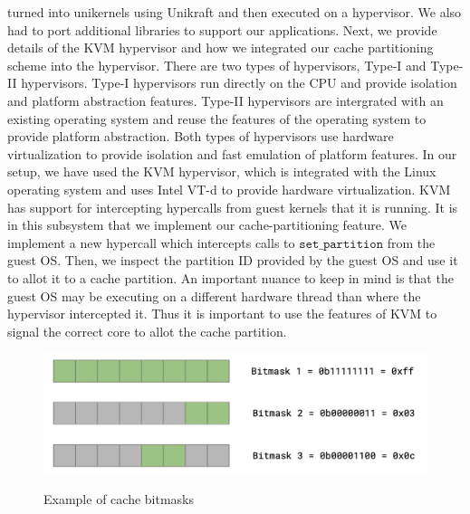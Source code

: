 \documentclass[sigconf,authorversion,noacm]{acmart}
\begin{document}
turned into unikernels using Unikraft and then executed on a hypervisor. We also
had to port additional libraries to support our applications. Next, we provide
details of the KVM hypervisor and how we integrated our cache partitioning
scheme into the hypervisor. There are two types of hypervisors, Type-I and
Type-II hypervisors. Type-I hypervisors run directly on the CPU and provide
isolation and platform abstraction features. Type-II hypervisors are intergrated
with an existing operating system and reuse the features of the operating
system to provide platform abstraction. Both types of hypervisors use hardware
virtualization to provide isolation and fast emulation of platform features. In
our setup, we have used the KVM hypervisor, which is integrated with the Linux
operating system and uses Intel VT-d to provide hardware virtualization. KVM has
support for intercepting hypercalls from guest kernels that it is running. It is
in this subsystem that we implement our cache-partitioning feature. We implement
a new hypercall which intercepts calls to $\texttt{set\_partition}$ from the
guest OS. Then, we inspect the partition ID provided by the guest OS and use it
to allot it to a cache partition. An important nuance to keep in mind is that
the guest OS may be executing on a different hardware thread than where the
hypervisor intercepted it. Thus it is important to use the features of KVM to
signal the correct core to allot the cache partition.

\begin{figure}[h]
  \centering
  \includegraphics[width=\linewidth]{bitmasks}
    \label{fig:bitmasks}
    \caption{Example of cache bitmasks}
\end{figure}
\end{document}
